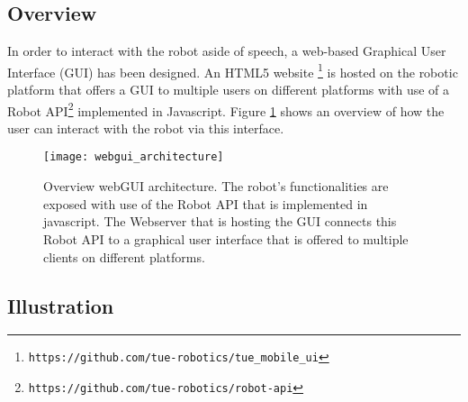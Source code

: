 \subsection*{Overview}

In order to interact with the robot aside of speech, a web-based Graphical User Interface (GUI) has been designed. An HTML5 website \footnote{\texttt{https://github.com/tue-robotics/tue\_mobile\_ui}} is hosted on the robotic platform that offers a GUI to multiple users on different platforms with use of a Robot API\footnote{\texttt{https://github.com/tue-robotics/robot-api}} implemented in Javascript. Figure \ref{fig:webgui_architecture} shows an overview of how the user can interact with the robot via this interface.

\begin{figure}[ht]
        \texttt{[image: webgui\_architecture]}
        \caption{Overview webGUI architecture. The robot's functionalities are exposed with use of the Robot API that is implemented in javascript. The Webserver that is hosting the GUI connects this Robot API to a graphical user interface that is offered to multiple clients on different platforms.}
        \label{fig:webgui_architecture}
\end{figure}

\subsection*{Illustration}


